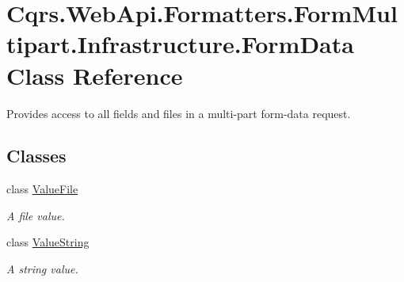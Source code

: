 \hypertarget{classCqrs_1_1WebApi_1_1Formatters_1_1FormMultipart_1_1Infrastructure_1_1FormData}{}\section{Cqrs.\+Web\+Api.\+Formatters.\+Form\+Multipart.\+Infrastructure.\+Form\+Data Class Reference}
\label{classCqrs_1_1WebApi_1_1Formatters_1_1FormMultipart_1_1Infrastructure_1_1FormData}


Provides access to all fields and files in a multi-\/part form-\/data request.  


\subsection*{Classes}
\begin{DoxyCompactItemize}
\item 
class \hyperlink{classCqrs_1_1WebApi_1_1Formatters_1_1FormMultipart_1_1Infrastructure_1_1FormData_1_1ValueFile}{Value\+File}
\begin{DoxyCompactList}\small\item\em A file value. \end{DoxyCompactList}\item 
class \hyperlink{classCqrs_1_1WebApi_1_1Formatters_1_1FormMultipart_1_1Infrastructure_1_1FormData_1_1ValueString}{Value\+String}
\begin{DoxyCompactList}\small\item\em A string value. \end{DoxyCompactList}\end{DoxyCompactItemize}
